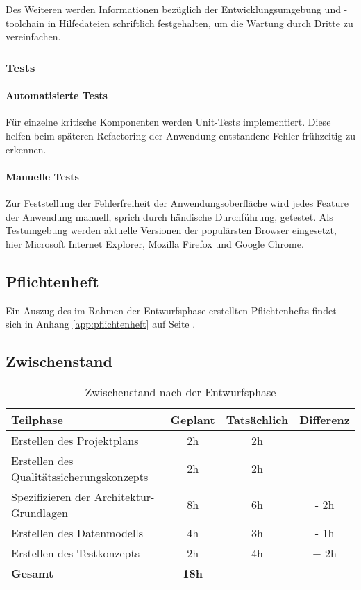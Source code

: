 \documentclass[12pt, xcolor=dvipsnames]{scrartcl}
\begin{document}
Des Weiteren werden Informationen bezüglich der Entwicklungsumgebung und -toolchain in Hilfedateien schriftlich festgehalten, um die Wartung durch Dritte zu vereinfachen.

\subsubsection*{Tests}
\label{sec:test:test}

\paragraph{Automatisierte Tests}
Für einzelne kritische Komponenten werden Unit-Tests implementiert. Diese helfen beim späteren Refactoring der Anwendung entstandene Fehler frühzeitig zu erkennen.

\paragraph{Manuelle Tests}
Zur Feststellung der Fehlerfreiheit der Anwendungsoberfläche wird jedes Feature der Anwendung manuell,
sprich durch händische Durchführung, getestet. Als Testumgebung werden aktuelle Versionen der populärsten Browser eingesetzt, hier Microsoft Internet Explorer, Mozilla Firefox und Google Chrome.

\subsection{Pflichtenheft}
Ein Auszug des im Rahmen der Entwurfsphase erstellten Pflichtenhefts findet sich in Anhang \ref{app:pflichtenheft} auf Seite \pageref{app:pflichtenheft}.

\subsection{Zwischenstand}

\begin{table}[H]
	\centering
	\begin{tabular}{lccc}

		\rowcolor{white!15}				
		\textbf{Teilphase} & \textbf{Geplant} & \textbf{Tatsächlich} & \textbf{Differenz} \\\hline		
		

		Erstellen des Projektplans & 2h & 2h & \\	    
	    Erstellen des Qualitätssicherungskonzepts & 2h & 2h & \\	    
	    Spezifizieren der Architektur-Grundlagen & 8h & 6h & - 2h\\	     
	    Erstellen des Datenmodells & 4h & 3h & - 1h \\	      
	    Erstellen des Testkonzepts & 2h & 4h & + 2h \\\hline

		\rowcolor{white!15}				
		\textbf{Gesamt} & \textbf{18h} & \textbf{\timeEntwurf} & \textbf{\timeEntwurfDiff} \\			

	    
	\end{tabular}
	\caption{Zwischenstand nach der Entwurfsphase}
	\label{tab:zwischenstand_entwurfsphase}
	\end{table}
\end{document}
